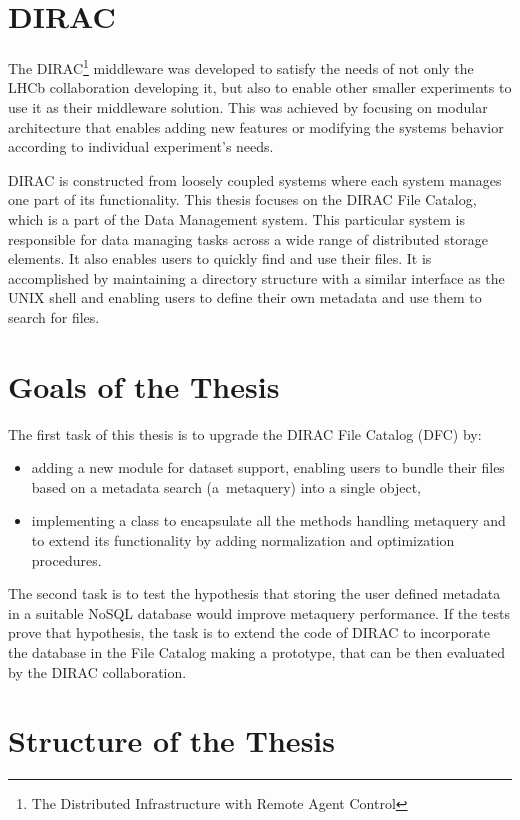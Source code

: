 \section*{DIRAC}

The DIRAC\footnote{The Distributed Infrastructure with Remote Agent Control} middleware was developed to satisfy
the needs of not only the LHCb collaboration developing it, but also to enable other smaller experiments to use
it as their middleware solution. This was achieved by focusing on modular architecture that enables
adding new features or modifying the systems behavior according to individual experiment's needs. 

DIRAC is constructed from loosely coupled systems where each system manages one part of its functionality. This 
thesis focuses on the DIRAC File Catalog, which is a part of the Data Management system. This particular 
system is responsible for data managing tasks across a wide range of distributed storage elements. It also enables 
users to quickly find and use their files. It is accomplished by maintaining a 
directory structure with a similar interface as the UNIX shell and enabling users to define their own metadata
and use them to search for files.

\section*{Goals of the Thesis}

The first task of this thesis is to upgrade the DIRAC File Catalog (DFC) by:
\begin{itemize}
\item adding a new module for dataset support, enabling users to bundle their files based on a metadata search 
(a~metaquery) into a single object,
\item implementing a class to encapsulate all the methods handling metaquery and to extend its 
functionality by adding normalization and optimization procedures.
\end{itemize}

The second task is to test the hypothesis that storing the user defined metadata in a suitable NoSQL database 
would improve metaquery performance. If the tests prove that hypothesis, the task is to extend the code of DIRAC 
to incorporate the database in the File Catalog making a prototype, that can be then evaluated by the DIRAC 
collaboration.

\section*{Structure of the Thesis}

